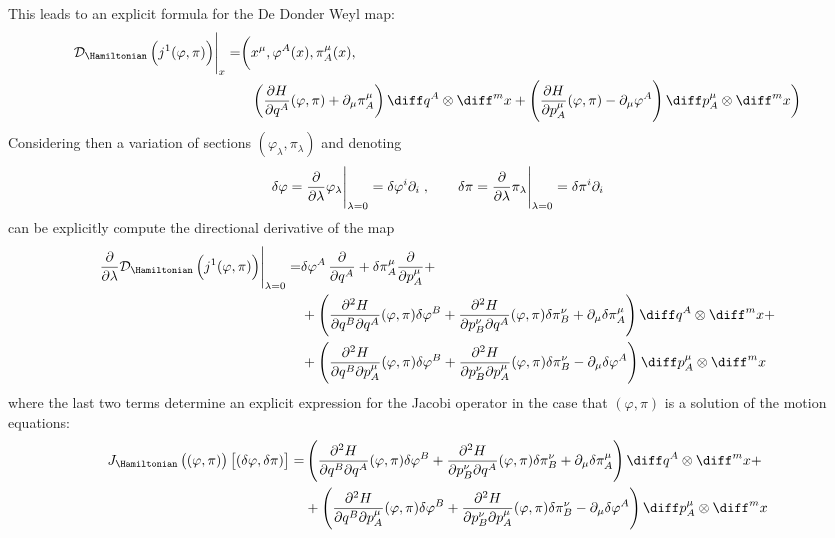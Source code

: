 \documentclass[a4paper,12pt]{scrartcl}  %
\begin{document}
%
This leads to an explicit formula for the De Donder Weyl map:
\begin{align*}
	\eval{\mathcal{D}_\Hamiltonian \left( j^1 (\varphi, \pi) \right) }_{x} = \biggr( & 
		x^\mu, \varphi^A(x), \pi^\mu_A(x), \\
		& \left( \frac{\partial H}{\partial q^A} (\varphi,\pi) + \partial_\mu \pi^\mu_A \right)	\diff q^A \otimes \diff^m x 
			+ \left( \frac{\partial H}{\partial p^\mu_A} (\varphi,\pi) - \partial_\mu \varphi^A \right)	\diff p^\mu_A \otimes \diff^m x
		\biggr)
\end{align*}
%
Considering then a variation of sections $(\varphi_\lambda, \pi_\lambda)$ and denoting
\begin{displaymath}
	\delta \varphi = 
	\eval{ \dfrac{\partial}{\partial \lambda} \varphi_\lambda }_{ \lambda=0} =
	\delta \varphi^i \partial_i	\\
	\; , \qquad
	\delta \pi = 
	\eval{ \dfrac{\partial}{\partial \lambda} \pi_\lambda }_{ \lambda=0} =
	\delta \pi^i \partial_i
\end{displaymath}
can be explicitly compute the directional derivative of the map
\begin{align*}
	\eval{ \dfrac{\partial}{\partial \lambda} \mathcal{D}_\Hamiltonian \left( j^1 (\varphi, \pi) \right)}_{ \lambda=0} = &
	\delta \varphi^A \, \dfrac{\partial}{\partial q^A} + 
	\delta \pi^\mu_A \dfrac{\partial}{\partial p^\mu_A} + \\
	& + \left( 
		\frac{\partial^2 H}{\partial q^B \partial q^A} (\varphi, \pi) \delta \varphi^B +
		\frac{\partial^2 H}{\partial p^\nu_B \partial q^A} (\varphi, \pi) \delta \pi^\nu_B +
		\partial_\mu \delta \pi^\mu_A
	\right)\diff q^A  \otimes \diff^m x + \\
	& + \left( 
		\frac{\partial^2 H}{\partial q^B \partial p^\mu_A} (\varphi, \pi) \delta \varphi^B +
		\frac{\partial^2 H}{\partial p^\nu_B \partial p^\mu_A}(\varphi, \pi) \delta \pi^\nu_B -
		\partial_\mu \delta \varphi^A
	\right)\diff p^\mu_A  \otimes \diff^m x
\end{align*}
where the last two terms determine an explicit expression for the Jacobi operator in the case that $(\varphi,\pi)$ is a solution of the motion equations:
\begin{align*}
	J_\Hamiltonian\left( (\varphi, \pi)\right) \left[ (\delta\varphi , \delta \pi ) \right] =
	& \left( 
		\frac{\partial^2 H}{\partial q^B \partial q^A} (\varphi, \pi) \delta \varphi^B +
		\frac{\partial^2 H}{\partial p^\nu_B \partial q^A} (\varphi, \pi) \delta \pi^\nu_B +
		\partial_\mu \delta \pi^\mu_A
	\right)\diff q^A  \otimes \diff^m x + \\
	& + \left( 
		\frac{\partial^2 H}{\partial q^B \partial p^\mu_A} (\varphi, \pi) \delta \varphi^B +
		\frac{\partial^2 H}{\partial p^\nu_B \partial p^\mu_A}(\varphi, \pi) \delta \pi^\nu_B -
		\partial_\mu \delta \varphi^A
	\right)\diff p^\mu_A  \otimes \diff^m x
\end{align*}
\end{document}
